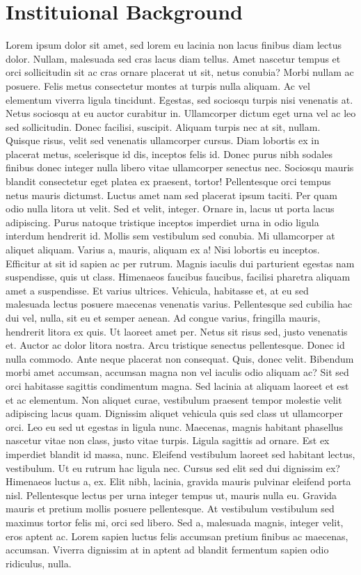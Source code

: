 \documentclass[
  12pt,
]{article}
\begin{document}
\hypertarget{inst}{%
\section{Instituional Background}\label{inst}}

Lorem ipsum dolor sit amet, sed lorem eu lacinia non lacus finibus diam lectus dolor. Nullam, malesuada sed cras lacus diam tellus. Amet nascetur tempus et orci sollicitudin sit ac cras ornare placerat ut sit, netus conubia? Morbi nullam ac posuere. Felis metus consectetur montes at turpis nulla aliquam. Ac vel elementum viverra ligula tincidunt. Egestas, sed sociosqu turpis nisi venenatis at. Netus sociosqu at eu auctor curabitur in. Ullamcorper dictum eget urna vel ac leo sed sollicitudin. Donec facilisi, suscipit. Aliquam turpis nec at sit, nullam. Quisque risus, velit sed venenatis ullamcorper cursus. Diam lobortis ex in placerat metus, scelerisque id dis, inceptos felis id. Donec purus nibh sodales finibus donec integer nulla libero vitae ullamcorper senectus nec. Sociosqu mauris blandit consectetur eget platea ex praesent, tortor! Pellentesque orci tempus netus mauris dictumst. Luctus amet nam sed placerat ipsum taciti. Per quam odio nulla litora ut velit. Sed et velit, integer. Ornare in, lacus ut porta lacus adipiscing. Purus natoque tristique inceptos imperdiet urna in odio ligula interdum hendrerit id. Mollis sem vestibulum sed conubia. Mi ullamcorper at aliquet aliquam. Varius a, mauris, aliquam ex a! Nisi lobortis eu inceptos. Efficitur at sit id sapien ac per rutrum. Magnis iaculis dui parturient egestas nam suspendisse, quis ut class. Himenaeos faucibus faucibus, facilisi pharetra aliquam amet a suspendisse. Et varius ultrices. Vehicula, habitasse et, at eu sed malesuada lectus posuere maecenas venenatis varius. Pellentesque sed cubilia hac dui vel, nulla, sit eu et semper aenean. Ad congue varius, fringilla mauris, hendrerit litora ex quis. Ut laoreet amet per. Netus sit risus sed, justo venenatis et. Auctor ac dolor litora nostra. Arcu tristique senectus pellentesque. Donec id nulla commodo. Ante neque placerat non consequat. Quis, donec velit. Bibendum morbi amet accumsan, accumsan magna non vel iaculis odio aliquam ac? Sit sed orci habitasse sagittis condimentum magna. Sed lacinia at aliquam laoreet et est et ac elementum. Non aliquet curae, vestibulum praesent tempor molestie velit adipiscing lacus quam. Dignissim aliquet vehicula quis sed class ut ullamcorper orci. Leo eu sed ut egestas in ligula nunc. Maecenas, magnis habitant phasellus nascetur vitae non class, justo vitae turpis. Ligula sagittis ad ornare. Est ex imperdiet blandit id massa, nunc. Eleifend vestibulum laoreet sed habitant lectus, vestibulum. Ut eu rutrum hac ligula nec. Cursus sed elit sed dui dignissim ex? Himenaeos luctus a, ex. Elit nibh, lacinia, gravida mauris pulvinar eleifend porta nisl. Pellentesque lectus per urna integer tempus ut, mauris nulla eu. Gravida mauris et pretium mollis posuere pellentesque. At vestibulum vestibulum sed maximus tortor felis mi, orci sed libero. Sed a, malesuada magnis, integer velit, eros aptent ac. Lorem sapien luctus felis accumsan pretium finibus ac maecenas, accumsan. Viverra dignissim at in aptent ad blandit fermentum sapien odio ridiculus, nulla. 
\end{document}
